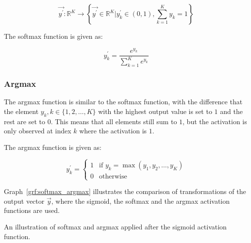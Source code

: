 \begin{equation}
    \vec{y^{'}} \colon \mathbb{R}^{K} \to \left\{\vec{y^{'}} \in \mathbb{R}^{K} \vert y^{'}_k \in (0,1), \sum_{k=1}^{K} y_k = 1\right\}
    \label{eq:sum_after_softmax}
\end{equation}

\noindent The softmax function is given as:

\begin{equation}
    y^{'}_k = \frac{e^{y_k}}{\sum_{k = 1}^{K}e^{y_k}}
    \label{eq:softmax}
\end{equation}


\subsubsection{Argmax}
\label{sec:anns:an:output:argmax}

The argmax function is similar to the softmax
function, with the difference that the element $y_k, k \in \{1,2, \dots, K\}$
with the highest output value is set to $1$ and the rest are set to $0$. This
means that all elements still sum to $1$, but the activation is only observed at
index $k$ where the activation is $1$.

The argmax function is given as:

\begin{equation}
    y^{'}_k = 
    \begin{cases}
        1 & \text{if $y_k = \max(y_1, y_2, \dots, y_K)$}\\
        0 & \text{otherwise}
        \label{eq:argmax}
    \end{cases}
\end{equation}

\noindent Graph~\ref{grf:softmax_argmax} illustrates the comparison of
transformations of the output vector $\vec{y}$, where the
sigmoid, the softmax and the argmax
activation functions are used.


\begin{graph}[H]
    \centering
    \resizebox{0.8\textwidth}{!}{}
    \caption[The results of softmax and argmax]{An
        illustration of softmax and argmax applied
    after the sigmoid activation function.}
    \label{grf:softmax_argmax}
\end{graph}


